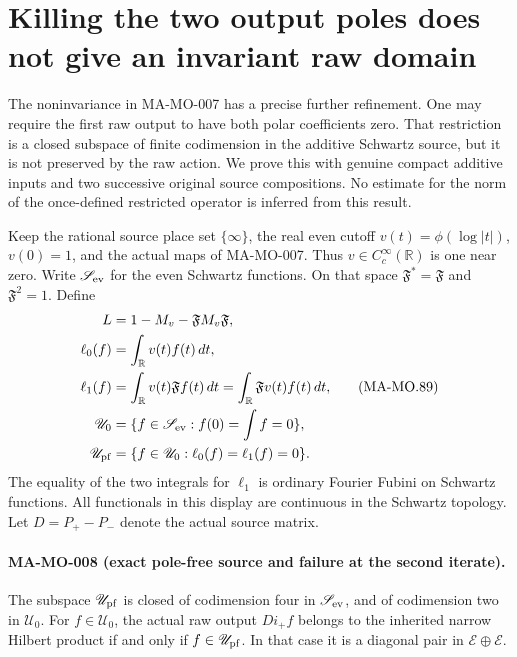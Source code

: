 \section{Killing the two output poles does not give an invariant raw domain}
\label{sec:pole-free-noninvariance}

The noninvariance in MA-MO-007 has a precise further refinement.
One may require the first raw output to have both polar coefficients
zero. That restriction is a closed subspace of finite codimension in
the additive Schwartz source, but it is not preserved by the raw
action. We prove this with genuine compact additive inputs and two
successive original source compositions. No estimate for the norm of
the once-defined restricted operator is inferred from this result.

Keep the rational source place set \(\{\infty\}\), the real even
cutoff \(v(t)=\phi(\log|t|)\), \(v(0)=1\), and the actual maps
of MA-MO-007. Thus \(v\in C_c^\infty(\mathbb R)\) is one near
zero. Write \(\mathscr S_{\rm ev}\) for the even Schwartz functions.
On that space \(\mathfrak F^*=\mathfrak F\) and
\(\mathfrak F^2=1\). Define
\[
 \begin{aligned}
 L&=1-M_v-\mathfrak F M_v\mathfrak F,\\
 \ell_0(f)&=\int_{\mathbb R}v(t)f(t)\,dt,\\
 \ell_1(f)&=\int_{\mathbb R}v(t)\mathfrak Ff(t)\,dt
             =\int_{\mathbb R}\mathfrak Fv(t)f(t)\,dt,\\
 \mathscr U_0&=\{f\in\mathscr S_{\rm ev}:f(0)=\int f=0\},\\
 \mathscr U_{\rm pf}&=\{f\in\mathscr U_0:
                                      \ell_0(f)=\ell_1(f)=0\}.
 \end{aligned}
 \tag{MA-MO.89}
\]
The equality of the two integrals for \(\ell_1\) is ordinary
Fourier Fubini on Schwartz functions. All functionals in this display
are continuous in the Schwartz topology. Let
\(D=P_+-P_-\) denote the actual source matrix.

\paragraph{MA-MO-008 (exact pole-free source and failure at the second iterate).}
The subspace \(\mathscr U_{\rm pf}\) is closed of codimension four
in \(\mathscr S_{\rm ev}\), and of codimension two in
\(\mathscr U_0\). For \(f\in\mathscr U_0\), the actual raw output
\(D i_+f\) belongs to the inherited narrow Hilbert product if and
only if \(f\in\mathscr U_{\rm pf}\). In that case it is a diagonal
pair in \(\mathcal E\oplus\mathcal E\).


